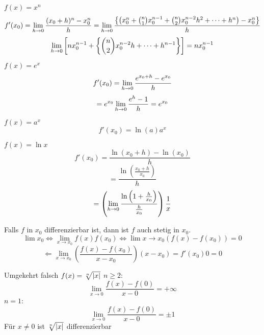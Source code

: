 \begin{Bsp}
  $f(x)=x^n$
  \[f'(x_0)=\displaystyle\lim_{h\rightarrow0}\frac{(x_0+h)^n-x_0^n}{h}=\displaystyle\lim_{h\rightarrow0}\frac{\left\{ \left( x_0^n+\binom{n}{1}x_0^{n-1}+\binom{n}{2}x_0^{n-2}h^2+\cdots + h^n \right)-x_0^n \right\}}{h}\]
  \[\displaystyle\lim_{h\rightarrow0}\left[ nx_0^{n-1}+\left\{ \binom{n}{2}x_0^{n-2}h+\cdots+h^{n-1} \right\} \right]=nx_0^{n-1}\]
\end{Bsp}
\begin{Bsp}
  $f(x)=e^x$
  \[f'(x_0)=\displaystyle\lim_{h\rightarrow0}\frac{e^{x_0+h}-e^{x_0}}{h}\]
  \[=e^{x_0}\displaystyle\lim_{h\rightarrow0}\frac{e^h-1}{h}=e^{x_0}\]
\end{Bsp}
\begin{Ueb}
  $f(x)=a^x$
  \[f'(x_0)=\ln(a) a^x\]
\end{Ueb}
\begin{Bsp}
  $f(x)=\ln x$
  \[f'(x_0)=\frac{\ln(x_0+h)-\ln(x_0)}{h}\]
  \[=\frac{\ln\left( \frac{x_0+h}{x_0} \right)}{h}\]
  \[=\left( \displaystyle\lim_{h\rightarrow0}\frac{\ln\left( 1+\frac{h}{x_0} \right)}{\frac{h}{x_0}} \right)\frac{1}{x}\]
\end{Bsp}
\begin{Bem}
  Falls $f$ in $x_0$ differenzierbar ist, dann ist $f$ auch stetig in $x_0$.
  \[\lim x_0\iff\lim_{x\to x_0}f(x)f(x_0)\iff\lim{x\to x_0}\left( f(x)-f(x_0) \right)=0\]
  \[\Leftarrow\lim_{x\to x_0}\left( \frac{f(x)-f(x_0)}{x-x_0} \right)(x-x_0)=f'(x_0)0=0\]
\end{Bem}
\begin{Bem}
  Umgekehrt falsch $f(x)=\sqrt[n]{\mathopen| x \mathclose|}$
  $n\geq 2$:
  \[\lim_{x\to 0}\frac{f(x)-f(0)}{x-0}=+\infty\]
  $n=1$:
  \[\lim_{x\to 0}\frac{f(x)-f(0)}{x-0}=\pm1\]
  Für $x\neq 0$ ist $\sqrt[n]{\mathopen| x \mathclose|}$ differenzierbar
\end{Bem}
